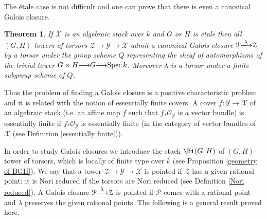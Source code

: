 \documentclass[12pt,reqno]{amsart}
\theoremstyle{plain}
\theoremstyle{definition}
\numberwithin{thm}{section}
\newcounter{x}\setcounter{x}{1}
\theoremstyle{plain}
\newtheorem{thmI}{Theorem}
\begin{document}
The \'etale case is not difficult and one can prove that there is even a canonical Galois closure. 
\begin{thmI}\label{Galois closure when G or H is etale}
 If ${\mathcal{X}}$ is an algebraic stack over $k$ and $G$ or $H$ is \'etale then all $(G,H)$-towers of torsors ${\mathcal{Z}}{\longrightarrow} {\mathcal{Y}}{\longrightarrow} {\mathcal{X}}$ admit a canonical Galois closure ${\mathcal{P}}{\xlongrightarrow{\lambda}} {\mathcal{Z}}$ by a torsor under the group scheme $Q$ representing the sheaf of automorphisms of the trivial tower $G\times H{\longrightarrow} G{\longrightarrow} {{\rm Spec \,}} k$. Moreover $\lambda$ is a torsor under a finite subgroup scheme of $Q$.
\end{thmI}
Thus the problem of finding a Galois closure is a positive characteristic problem and it is related with the notion of essentially finite covers. A cover $f\colon {\mathcal{Y}}{\longrightarrow} {\mathcal{X}}$ of an algebraic stack (i.e. an affine map $f$ such that $f_*{\mathcal{O}_{\mathcal{Y}}}$ is a vector bundle) is essentially finite if  $f_*{\mathcal{O}_{\mathcal{Y}}}$ is essentially finite (in the category of vector bundles of ${\mathcal{X}}$ (see Definition \ref{essentially finite})).

In order to study Galois closures we introduce the stack $\Bi(G,H)$ of $(G,H)$-tower of torsors, which is locally of finite type over $k$ (see Proposition \ref{geometry of BGH}). We say that a tower ${\mathcal{Z}}{\longrightarrow}{\mathcal{Y}}{\longrightarrow}{\mathcal{X}}$ is pointed if ${\mathcal{Z}}$ has a given rational point; it is Nori reduced if the torsors are Nori reduced (see Definition \ref{Nori reduced}). A Galois closure ${\mathcal{P}}{\xlongrightarrow{\lambda}} {\mathcal{Z}}$ is pointed if ${\mathcal{P}}$ comes with a rational point and $\lambda$ preserves the given rational points.
The following is a general result proved here.
\end{document}
